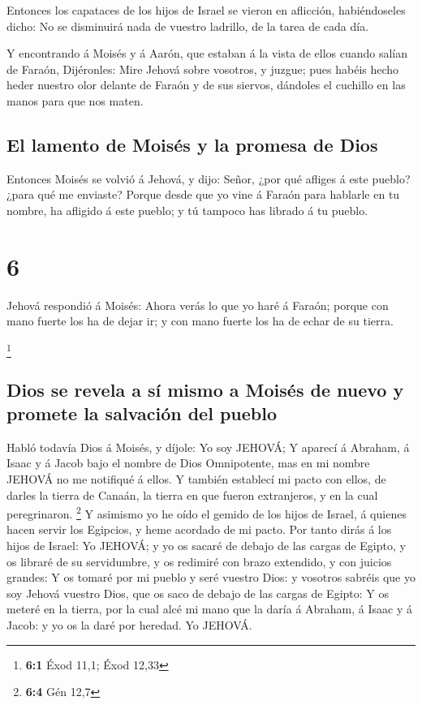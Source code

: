  Entonces los capataces de los hijos de Israel se vieron en
aflicción, habiéndoseles dicho: No se disminuirá nada de vuestro
ladrillo, de la tarea de cada día.

 Y encontrando á Moisés y á Aarón, que estaban á la vista
de ellos cuando salían de Faraón,  Dijéronles: Mire Jehová
sobre vosotros, y juzgue; pues habéis hecho heder nuestro olor delante
de Faraón y de sus siervos, dándoles el cuchillo en las manos para que
nos maten.

\hypertarget{el-lamento-de-moisuxe9s-y-la-promesa-de-dios}{%
\subsection{El lamento de Moisés y la promesa de
Dios}\label{el-lamento-de-moisuxe9s-y-la-promesa-de-dios}}

 Entonces Moisés se volvió á Jehová, y dijo: Señor, ¿por
qué afliges á este pueblo? ¿para qué me enviaste?  Porque
desde que yo vine á Faraón para hablarle en tu nombre, ha afligido á
este pueblo; y tú tampoco has librado á tu pueblo.

\hypertarget{section-5}{%
\section{6}\label{section-5}}

 Jehová respondió á Moisés: Ahora verás lo que yo haré á
Faraón; porque con mano fuerte los ha de dejar ir; y con mano fuerte los
ha de echar de su tierra.

\footnote{\textbf{6:1} Éxod 11,1; Éxod 12,33}

\hypertarget{dios-se-revela-a-suxed-mismo-a-moisuxe9s-de-nuevo-y-promete-la-salvaciuxf3n-del-pueblo}{%
\subsection{Dios se revela a sí mismo a Moisés de nuevo y promete la
salvación del
pueblo}\label{dios-se-revela-a-suxed-mismo-a-moisuxe9s-de-nuevo-y-promete-la-salvaciuxf3n-del-pueblo}}

 Habló todavía Dios á Moisés, y díjole: Yo soy JEHOVÁ;
 Y aparecí á Abraham, á Isaac y á Jacob bajo el nombre de
Dios Omnipotente, mas en mi nombre JEHOVÁ no me notifiqué á ellos.
 Y también establecí mi pacto con ellos, de darles la tierra
de Canaán, la tierra en que fueron extranjeros, y en la cual
peregrinaron. \footnote{\textbf{6:4} Gén 12,7}  Y asimismo
yo he oído el gemido de los hijos de Israel, á quienes hacen servir los
Egipcios, y heme acordado de mi pacto.  Por tanto dirás á
los hijos de Israel: Yo JEHOVÁ; y yo os sacaré de debajo de las cargas
de Egipto, y os libraré de su servidumbre, y os redimiré con brazo
extendido, y con juicios grandes:  Y os tomaré por mi pueblo
y seré vuestro Dios: y vosotros sabréis que yo soy Jehová vuestro Dios,
que os saco de debajo de las cargas de Egipto:  Y os meteré
en la tierra, por la cual alcé mi mano que la daría á Abraham, á Isaac y
á Jacob: y yo os la daré por heredad. Yo JEHOVÁ.

